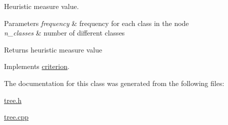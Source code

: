 Heuristic measure value. 


\begin{DoxyParams}{Parameters}
{\em frequency} & frequency for each class in the node \\
\hline
{\em n\+\_\+classes} & number of different classes\\
\hline
\end{DoxyParams}
\begin{DoxyReturn}{Returns}
heuristic measure value 
\end{DoxyReturn}


Implements \hyperlink{classcriterion_a1fbda0723578acd5ac612248a54ba71d}{criterion}.



The documentation for this class was generated from the following files\+:\begin{DoxyCompactItemize}
\item 
\hyperlink{tree_8h}{tree.\+h}\item 
\hyperlink{tree_8cpp}{tree.\+cpp}\end{DoxyCompactItemize}
